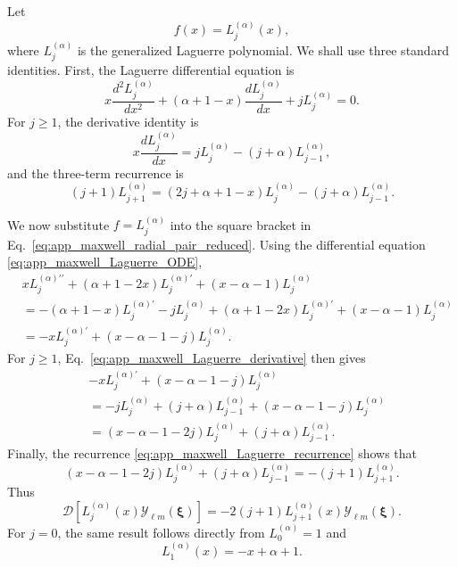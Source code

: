 \documentclass[11pt,oneside]{article}
\numberwithin{equation}{section}
\theoremstyle{definition}
\begin{document}
Let
\begin{equation}
f(x)=L_j^{(\alpha)}(x),
\end{equation}
where $L_j^{(\alpha)}$ is the generalized Laguerre polynomial.  We shall use
three standard identities.  First, the Laguerre differential equation is
\begin{equation}
x\frac{d^2L_j^{(\alpha)}}{dx^2}
+
(\alpha+1-x)
\frac{dL_j^{(\alpha)}}{dx}
+
jL_j^{(\alpha)}
=
0.
\label{eq:app_maxwell_Laguerre_ODE}
\end{equation}
For $j\geq1$, the derivative identity is
\begin{equation}
x\frac{dL_j^{(\alpha)}}{dx}
=
jL_j^{(\alpha)}
-
(j+\alpha)L_{j-1}^{(\alpha)},
\label{eq:app_maxwell_Laguerre_derivative}
\end{equation}
and the three-term recurrence is
\begin{equation}
(j+1)L_{j+1}^{(\alpha)}
=
(2j+\alpha+1-x)L_j^{(\alpha)}
-
(j+\alpha)L_{j-1}^{(\alpha)}.
\label{eq:app_maxwell_Laguerre_recurrence}
\end{equation}

We now substitute $f=L_j^{(\alpha)}$ into the square bracket in
Eq.~\eqref{eq:app_maxwell_radial_pair_reduced}.  Using the differential
equation \eqref{eq:app_maxwell_Laguerre_ODE},
\begin{align}
&
x L_j^{(\alpha)\prime\prime}
+
(\alpha+1-2x)L_j^{(\alpha)\prime}
+
(x-\alpha-1)L_j^{(\alpha)}
\nonumber\\
&=
-
(\alpha+1-x)L_j^{(\alpha)\prime}
-
jL_j^{(\alpha)}
+
(\alpha+1-2x)L_j^{(\alpha)\prime}
+
(x-\alpha-1)L_j^{(\alpha)}
\nonumber\\
&=
-xL_j^{(\alpha)\prime}
+
(x-\alpha-1-j)L_j^{(\alpha)}.
\label{eq:app_maxwell_Laguerre_step1}
\end{align}
For $j\geq1$, Eq.~\eqref{eq:app_maxwell_Laguerre_derivative} then gives
\begin{align}
&
-xL_j^{(\alpha)\prime}
+
(x-\alpha-1-j)L_j^{(\alpha)}
\nonumber\\
&=
-jL_j^{(\alpha)}
+
(j+\alpha)L_{j-1}^{(\alpha)}
+
(x-\alpha-1-j)L_j^{(\alpha)}
\nonumber\\
&=
(x-\alpha-1-2j)L_j^{(\alpha)}
+
(j+\alpha)L_{j-1}^{(\alpha)}.
\label{eq:app_maxwell_Laguerre_step2}
\end{align}
Finally, the recurrence
\eqref{eq:app_maxwell_Laguerre_recurrence} shows that
\begin{equation}
(x-\alpha-1-2j)L_j^{(\alpha)}
+
(j+\alpha)L_{j-1}^{(\alpha)}
=
-(j+1)L_{j+1}^{(\alpha)}.
\label{eq:app_maxwell_Laguerre_step3}
\end{equation}
Thus
\begin{equation}
\mathcal D
\left[
L_j^{(\alpha)}(x)
\mathcal Y_{\ell m}(\bm\xi)
\right]
=
-2(j+1)
L_{j+1}^{(\alpha)}(x)
\mathcal Y_{\ell m}(\bm\xi).
\label{eq:app_maxwell_Laguerre_raising}
\end{equation}
For $j=0$, the same result follows directly from
$L_0^{(\alpha)}=1$ and
\begin{equation}
L_1^{(\alpha)}(x)
=
-x+\alpha+1.
\end{equation}
\end{document}
